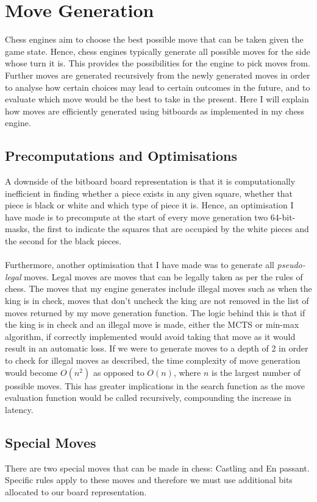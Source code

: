 \chapter{Move Generation}
Chess engines aim to choose the best possible move that can be taken given the game state. Hence, chess engines typically generate all possible moves for the side whose turn it is. This provides the possibilities for the engine to pick moves from. Further moves are generated recursively from the newly generated moves in order to analyse how certain choices may lead to certain outcomes in the future, and to evaluate which move would be the best to take in the present. Here I will explain how moves are efficiently generated using bitboards as implemented in my chess engine.
\section{Precomputations and Optimisations}
A downside of the bitboard board representation is that it is computationally inefficient in finding whether a piece exists in any given square, whether that piece is black or white and which type of piece it is. Hence, an optimisation I have made is to precompute at the start of every move generation two 64-bit-masks, the first to indicate the squares that are occupied by the white pieces and the second for the black pieces.\\\\
Furthermore, another optimisation that I have made was to generate all \textit{pseudo-legal} moves. Legal moves are moves that can be legally taken as per the rules of chess. The moves that my engine generates include illegal moves such as when the king is in check, moves that don't uncheck the king are not removed in the list of moves returned by my move generation function. The logic behind this is that if the king is in check and an illegal move is made, either the MCTS or min-max algorithm, if correctly implemented would avoid taking that move as it would result in an automatic loss. If we were to generate moves to a depth of 2 in order to check for illegal moves as described, the time complexity of move generation would become $O(n^2)$ as opposed to $O(n)$, where $n$ is the largest number of possible moves. This has greater implications in the search function as the move evaluation function would be called recursively, compounding the increase in latency.
\section{Special Moves}
There are two special moves that can be made in chess: Castling and En passant. Specific rules apply to these moves and therefore we must use additional bits allocated to our board representation.
